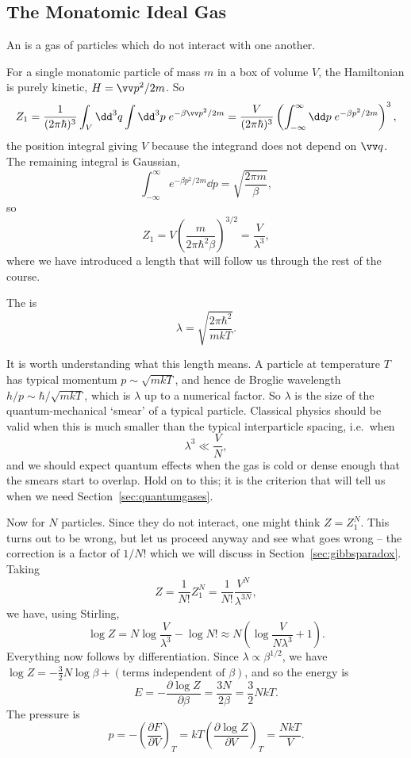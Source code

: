 \subsection{The Monatomic Ideal Gas}\label{sec:idealgas}

\begin{definition}
	An  is a gas of particles which do not interact with one another.
\end{definition}

For a single monatomic particle of mass $m$ in a box of volume $V$, the Hamiltonian is purely kinetic, $H = \vv p^2/2m$. So
$$
Z_1 = \frac{1}{(2\pi\hbar)^3}\int_V \dd^3 q \int \dd^3 p \; e^{-\beta \vv p^2/2m} = \frac{V}{(2\pi\hbar)^3}\left(\int_{-\infty}^\infty \dd p\; e^{-\beta p^2/2m}\right)^3,
$$
the position integral giving $V$ because the integrand does not depend on $\vv q$. The remaining integral is Gaussian,
$$
\int_{-\infty}^{\infty} e^{-\beta p^2/2m}\dd p = \sqrt{\frac{2\pi m}{\beta}},
$$
so
$$
Z_1 = V\left(\frac{m}{2\pi\hbar^2\beta}\right)^{3/2} = \frac{V}{\lambda^3},
$$
where we have introduced a length that will follow us through the rest of the course.

\begin{definition}
	The  is
	$$
	\lambda = \sqrt{\frac{2\pi\hbar^2}{mkT}}.
	$$
\end{definition}

It is worth understanding what this length means. A particle at temperature $T$ has typical momentum $p \sim \sqrt{mkT}$, and hence de Broglie wavelength $h/p \sim \hbar/\sqrt{mkT}$, which is $\lambda$ up to a numerical factor. So $\lambda$ is the size of the quantum-mechanical `smear' of a typical particle. Classical physics should be valid when this is much smaller than the typical interparticle spacing, i.e.\ when
$$
\lambda^3 \ll \frac VN,
$$
and we should expect quantum effects when the gas is cold or dense enough that the smears start to overlap. Hold on to this; it is the criterion that will tell us when we need Section~\ref{sec:quantumgases}.

Now for $N$ particles. Since they do not interact, one might think $Z = Z_1^N$. This turns out to be wrong, but let us proceed anyway and see what goes wrong -- the correction is a factor of $1/N!$ which we will discuss in Section~\ref{sec:gibbsparadox}. Taking
$$
Z = \frac{1}{N!}Z_1^N = \frac{1}{N!}\frac{V^N}{\lambda^{3N}},
$$
we have, using Stirling,
$$
\log Z = N \log \frac{V}{\lambda^3} - \log N! \approx N\left(\log \frac{V}{N\lambda^3} + 1\right).
$$
Everything now follows by differentiation. Since $\lambda \propto \beta^{1/2}$, we have $\log Z = -\tfrac 32 N \log\beta + (\text{terms independent of }\beta)$, and so the energy is
$$
E = -\frac{\partial \log Z}{\partial\beta} = \frac{3N}{2\beta} = \frac 32 NkT.
$$
The pressure is
$$
p = -\left(\frac{\partial F}{\partial V}\right)_T = kT \left(\frac{\partial \log Z}{\partial V}\right)_T = \frac{NkT}{V}.
$$

